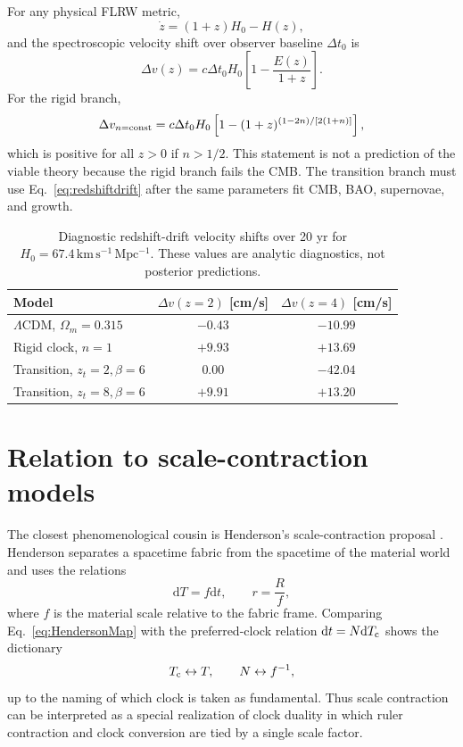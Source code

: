 \documentclass[aps,prd,reprint,nofootinbib,superscriptaddress,longbibliography]{revtex4-2}
\newcommand{\dd}{\mathrm{d}}
\newcommand{\Tc}{T_{\rm c}}
\newcommand{\kmsMpc}{\,\mathrm{km\,s^{-1}\,Mpc^{-1}}}
\begin{document}
For any physical FLRW metric,
\begin{equation}
  \dot z=(1+z)H_0-H(z),
\end{equation}
and the spectroscopic velocity shift over observer baseline $\Delta t_0$ is
\begin{equation}
  \Delta v(z)=c\Delta t_0H_0\left[1-\frac{E(z)}{1+z}\right].
  \label{eq:redshiftdrift}
\end{equation}
For the rigid branch,
\begin{equation}
  \Delta v_{n={\rm const}}=c\Delta t_0H_0
  \left[1-(1+z)^{(1-2n)/[2(1+n)]}\right],
\end{equation}
which is positive for all $z>0$ if $n>1/2$.  This statement is not a prediction of the viable theory because the rigid branch fails the CMB.  The transition branch must use Eq.~\eqref{eq:redshiftdrift} after the same parameters fit CMB, BAO, supernovae, and growth.

\begin{table}[t]
\caption{Diagnostic redshift-drift velocity shifts over 20 yr for $H_0=67.4\kmsMpc$.  These values are analytic diagnostics, not posterior predictions.}
\label{tab:redshiftdrift}
\begin{ruledtabular}
\begin{tabular}{lcc}
Model & $\Delta v(z=2)$ [cm/s] & $\Delta v(z=4)$ [cm/s] \\
\hline
$\Lambda$CDM, $\Omega_m=0.315$ & $-0.43$ & $-10.99$ \\
Rigid clock, $n=1$ & $+9.93$ & $+13.69$ \\
Transition, $z_t=2,\beta=6$ & $0.00$ & $-42.04$ \\
Transition, $z_t=8,\beta=6$ & $+9.91$ & $+13.20$ \\
\end{tabular}
\end{ruledtabular}
\end{table}

\section{Relation to scale-contraction models}

The closest phenomenological cousin is Henderson's scale-contraction proposal \cite{Henderson2026}.  Henderson separates a spacetime fabric from the spacetime of the material world and uses the relations
\begin{equation}
  \dd T=f\dd t,
  \qquad
  r=\frac{R}{f},
  \label{eq:HendersonMap}
\end{equation}
where $f$ is the material scale relative to the fabric frame.  Comparing Eq.~\eqref{eq:HendersonMap} with the preferred-clock relation $\dd t=N\dd\Tc$ shows the dictionary
\begin{equation}
  \Tc\leftrightarrow T,
  \qquad
  N\leftrightarrow f^{-1},
  \label{eq:dictionary}
\end{equation}
up to the naming of which clock is taken as fundamental.  Thus scale contraction can be interpreted as a special realization of clock duality in which ruler contraction and clock conversion are tied by a single scale factor.
\end{document}
